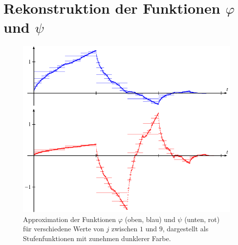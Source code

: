 %
%
%
\section{Rekonstruktion der Funktionen $\varphi$ und $\psi$
\label{section:rekonstruktion-aus-koef}}
\begin{figure}
\centering
\includegraphics{chapters/7-algo/images/approx.pdf}
\caption{Approximation der Funktionen $\varphi$ (oben, blau) und
$\psi$ (unten, rot) für verschiedene
Werte von $j$ zwischen $1$ und $9$, dargestellt als Stufenfunktionen
mit zunehmen dunklerer Farbe.
\label{buch:algo:approx}}
\end{figure}
